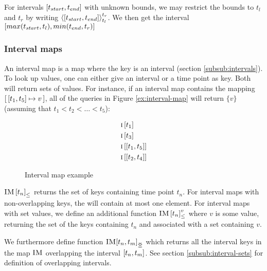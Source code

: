 For intervals $\interval{t_{start}}{t_{end}}$ with unknown bounds, we may restrict the bounds to $t_l$ and $t_r$ by writing $\clamp{\interval{t_{start}}{t_{end}}}{t_l}{t_r}$. We then get the interval $\interval{max(t_{start}, t_l)}{min(t_{end}, t_r)}$

\subsubsection{Interval maps}
\label{subsub:interval-maps}
An interval map is a map where the key is an interval (section \vref{subsub:intervals}). To look up values, one can either give an interval or a time point as key. Both will return sets of values. For instance, if an interval map  contains the mapping $\intervalmapping{t_1}{t_5}{v}$, all of the queries in Figure \vref{ex:interval-map} will return $\{v\}$ (assuming that $t_1 < t_2 < \ldots < t_5$):

\begin{figure}[h]
  \begin{align*}
    & \lookup{\map{i}}{t_1} \\
    & \lookup{\map{i}}{t_3} \\
    & \lookup{\map{i}}{\interval{t_1}{t_5}} \\
    & \lookup{\map{i}}{\interval{t_2}{t_4}}
  \end{align*}
  \caption{Interval map example}
  \label{ex:interval-map}
\end{figure}

${\textsc{IM} \left[ t_n \right]}_{\leq}$ returns the set of keys containing time point $t_n$. For interval maps with non-overlapping keys, the will contain at most one element. For interval maps with set values, we define an additional function ${\textsc{IM} \left[ t_n \right]^{v}_{\leq}}$ where $v$ is some value, returning the set of the keys containing $t_n$ and associated with a set containing $v$. 

We furthermore define function $\overlapping{\map{IM}}{t_n}{t_m}$ which returns all the interval keys in the map $\textsc{IM}$ overlapping the interval $\interval{t_n}{t_m}$. See section \vref{subsub:interval-sets} for definition of overlapping intervals. 

